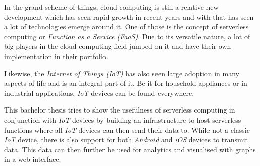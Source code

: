 In the grand scheme of things, cloud computing is still a relative new development which
has seen rapid growth in recent years and with that has seen a lot of technologies emerge around it.
One of those is the concept of serverless computing or \textit{Function as a Service
(FaaS)}. Due to its versatile nature, a lot of big players in the cloud computing field jumped on it
and have their own implementation in their portfolio.

Likewise, the \textit{Internet of Things (IoT)} has also seen large adoption in many aspects of life
and is an integral part of it. Be it for household appliances or in industrial applications,
\textit{IoT} devices can be found everywhere.

This bachelor thesis tries to show the usefulness of serverless computing in conjunction
with \textit{IoT} devices by building an infrastructure to host serverless functions where
all \textit{IoT} devices can then send their data to. While not a classic \textit{IoT} device, there
is also support for both \textit{Android} and \textit{iOS} devices to transmit data. This data can
then further be used for analytics and visualised with graphs in a web interface.
